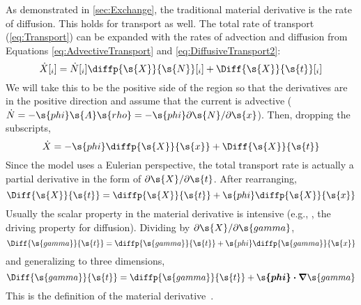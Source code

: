 As demonstrated in \autoref{sec:Exchange}, the traditional material derivative is the rate of diffusion.  This holds for transport as well.  The total rate of transport (\autoref{eq:Transport}) can be expanded with the rates of advection and diffusion from Equations \ref{eq:AdvectiveTransport} and \ref{eq:DiffusiveTransport2}:
\begin{equation}
  \dot{X}[_i]= \dot{N}[_i]\diffp{\s{X}}{\s{N}}[_i] + \Diff{\s{X}}{\s{t}}[_i]
\end{equation}
We will take this to be the positive side of the region so that the derivatives are in the positive direction and assume that the current is advective ($\dot{N} = -\s{phi}\s{A}\s{rho} =  -\s{phi}\partial\s{N}/\partial\s{x}$).  Then, dropping the subscripts,
\begin{equation}
  \dot{X} = -\s{phi}\diffp{\s{X}}{\s{x}} + \Diff{\s{X}}{\s{t}}
\end{equation}
Since the model uses a Eulerian perspective, the total transport rate  is actually a partial derivative in the form of $\partial\s{X}/\partial\s{t}$.  After rearranging,
\begin{equation}
  \Diff{\s{X}}{\s{t}} = \diffp{\s{X}}{\s{t}} + \s{phi}\diffp{\s{X}}{\s{x}}
\end{equation}
Usually the scalar property in the material derivative is intensive (e.g., , the driving property for diffusion).  Dividing by $\partial\s{X}/\partial\s{gamma}$,
\begin{equation}
  \Diff{\s{gamma}}{\s{t}} = \diffp{\s{gamma}}{\s{t}} + \s{phi}\diffp{\s{gamma}}{\s{x}}
\end{equation}
and generalizing to three dimensions,
\begin{equation}
  \Diff{\s{gamma}}{\s{t}} = \diffp{\s{gamma}}{\s{t}} + \boldsymbol{\s{phi}\cdot\nabla}\s{gamma}
\end{equation}
This is the definition of the material derivative~\cite{Bird2007}.



